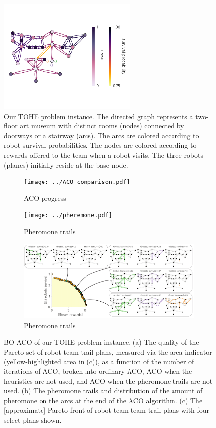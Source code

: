 \documentclass[11pt, oneside]{article}
\begin{document}
\begin{figure}[h!]
    \centering
    	\includegraphics[width=0.6\textwidth]{../art_museum_full_setup.pdf}
    \caption{Our TOHE problem instance. The directed graph represents a two-floor art museum with distinct rooms (nodes) connected by doorways or a stairway (arcs). The arcs are colored according to robot survival probabilities. The nodes are colored according to rewards offered to the team when a robot visits. The three robots (planes) initially reside at the base node. %
    } \label{fig:ex_setup}
\end{figure}

\begin{figure}[h!]
    \centering
     \begin{subfigure}[b]{0.39\textwidth}
    	\texttt{[image: ../ACO\_comparison.pdf]}
	\caption{ACO progress} \label{fig:aco_progress}
    \end{subfigure}
    \begin{subfigure}[b]{0.59\textwidth}
    	\texttt{[image: ../pheremone.pdf]}
	\caption{Pheromone trails} \label{fig:pheromone}
    \end{subfigure}
        \begin{subfigure}[b]{\textwidth}
    	\includegraphics[width=\textwidth]{drawings/real_pareto_front.pdf}
	\caption{Pheromone trails} \label{fig:pareto_front}
    \end{subfigure}
    \caption{BO-ACO of our TOHE problem instance. 
    (a) The quality of the Pareto-set of robot team trail plans, measured via the area indicator (yellow-highlighted area in (c)), as a function of the number of iterations of ACO, broken into ordinary ACO, ACO when the heuristics are not used, and ACO when the pheromone trails are not used.
    (b) The pheromone trails and distribution of the amount of pheromone on the arcs at the end of the ACO algorithm. 
    (c) The [approximate] Pareto-front of robot-team team trail plans with four select plans shown.
    }
\end{figure}
\end{document}
